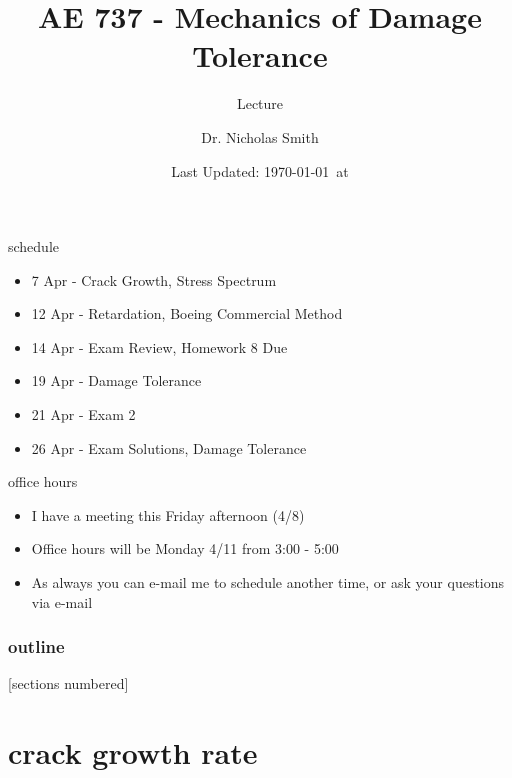 \documentclass[10pt]{beamer}
\title{AE 737 - Mechanics of Damage Tolerance}
\subtitle{Lecture \arabic{lecture}}
\date{Last Updated: \today\ at \DTMcurrenttime}
\author{Dr. Nicholas Smith}
\institute{Wichita State University, Department of Aerospace Engineering}
\begin{document}
\maketitle
\begin{frame}{schedule}
	\begin{itemize}
		\item 7 Apr - Crack Growth, Stress Spectrum
		\item 12 Apr - Retardation, Boeing Commercial Method
		\item 14 Apr - Exam Review, Homework 8 Due
		\item 19 Apr - Damage Tolerance
		\item 21 Apr - Exam 2
		\item 26 Apr - Exam Solutions, Damage Tolerance
	\end{itemize}
\end{frame}

\begin{frame}{office hours}
	\begin{itemize}
		\item I have a meeting this Friday afternoon (4/8)
		\item Office hours will be Monday 4/11 from 3:00 - 5:00
		\item As always you can e-mail me to schedule another time, or ask your questions via e-mail
	\end{itemize}
\end{frame}

\begin{frame}
  \frametitle{outline}
  [sections numbered]
  \tableofcontents[hideallsubsections]
\end{frame}

\section{crack growth rate}
\end{document}
